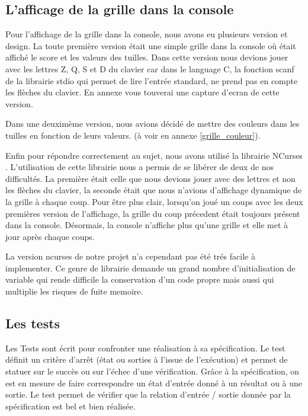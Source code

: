 \documentclass[12pt]{article}
\begin{document}
\subsection{L'afficage de la grille dans la console}
Pour l'affichage de la grille dans la console, nous avons eu plusieurs version
et design. La toute premi\`ere version \'etait une simple grille dans la console
o\`u \'etait affich\'e le score et les valeurs des tuilles. Dans cette version
nous devions jouer avec les lettres Z, Q, S et D du clavier car dans le language C, la
fonction \og scanf \fg{} de la librairie \og stdio \fg{} qui permet de
lire l'entr\'ee standard, ne prend pas en compte les fl\`eches du clavier.
En annexe vous touverai une capture d'ecran de cette version.\par
Dans une deuxim\`eme version, nous avions d\'ecid\'e de mettre des couleurs dans
les tuilles en fonction de leurs valeurs. (\`a voir en annexe \ref{grille_couleur}).\par
Enfin pour r\'epondre correctement au sujet, nous avons utilis\'e la librairie
\og NCurses \fg{}. L'utilisation de cette librairie nous a permis de se
lib\'erer de deux de nos difficult\'es. La premi\`ere \'etait celle que nous devions jouer
avec des lettres et non les fl\`eches du clavier, la seconde \'etait que nous
n'avions d'affichage dynamique de la grille \`a chaque coup. Pour \^etre plus
clair, lorsqu'on jou\'e un coups avec les deux premi\`eres version de
l'affichage, la grille du coup pr\'ecedent \'etait toujours pr\'esent dans la
console. D\'esormais, la console n'affiche plus qu'une grille et elle met \`a
jour apr\`es chaque coups.\par

La version ncurses de notre projet n'a cependant pas été trés facile à implementer.
Ce genre de librairie demande un grand nombre d'initialisation de variable qui rende
difficile la conservation d'un code propre mais aussi qui multiplie les risques de fuite memoire.

\subsection{Les tests}
Les Tests sont \'ecrit pour confronter une r\'ealisation \`a sa sp\'ecification.
Le test d\'efinit un crit\`ere d’arr\^et (\'etat ou sorties \`a l’issue de
l’ex\'ecution) et permet de statuer sur le succ\`es ou sur l’\'echec d’une
v\'erification. Gr\^ace \`a la sp\'ecification, on est en mesure de faire
correspondre un \'etat d’entr\'ee donn\'e \`a un r\'esultat ou \`a une sortie.
Le test permet de v\'erifier que la relation d’entr\'ee / sortie donn\'ee par la
sp\'ecification est bel et bien r\'ealis\'ee.
\cite{Test_unitaire}
\end{document}
